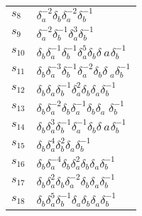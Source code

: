 \documentclass{article}
\begin{document}
\begin{center}
\begin{tabular}{ll}
$s_{8}$ & $\delta_a^{-2}\delta_b^{}\delta_a^{-2}\delta_b^{-1}$ \\
$s_{9}$ & $\delta_a^{-2}\delta_b^{-1}\delta_a^{3}\delta_b^{-1}$ \\
$s_{10}$ & $\delta_b^{}\delta_a^{-1}\delta_b^{-1}\delta_a^{5}\delta_b^{}\delta_\
a^{}\delta_b^{-1}$ \\
$s_{11}$ & $\delta_b^{}\delta_a^{-3}\delta_b^{-1}\delta_a^{-2}\delta_b^{}\delta\
_a^{}\delta_b^{-1}$ \\
$s_{12}$ & $\delta_b^{}\delta_a^{}\delta_b^{-1}\delta_a^{2}\delta_b^{}\delta_a^\
{}\delta_b^{-1}$ \\
$s_{13}$ & $\delta_b^{}\delta_a^{-2}\delta_b^{}\delta_a^{-1}\delta_b^{}\delta_a\
^{}\delta_b^{-1}$ \\
$s_{14}$ & $\delta_b^{}\delta_a^{3}\delta_b^{-1}\delta_a^{-1}\delta_b^{}\delta_\
a^{}\delta_b^{-1}$ \\
$s_{15}$ & $\delta_b^{}\delta_a^{4}\delta_b^{2}\delta_a^{}\delta_b^{-1}$ \\
$s_{16}$ & $\delta_b^{}\delta_a^{-4}\delta_b^{}\delta_a^{2}\delta_b^{}\delta_a^\
{}\delta_b^{-1}$ \\
$s_{17}$ & $\delta_b^{}\delta_a^{2}\delta_b^{}\delta_a^{-2}\delta_b^{}\delta_a^\
{}\delta_b^{-1}$ \\
$s_{18}$ & $\delta_b^{}\delta_a^{5}\delta_b^{-1}\delta_a^{}\delta_b^{}\delta_a^\
{}\delta_b^{-1}$ \\
\bottomrule
\end{tabular}
\end{center}

\thispagestyle{empty}
\end{document}
